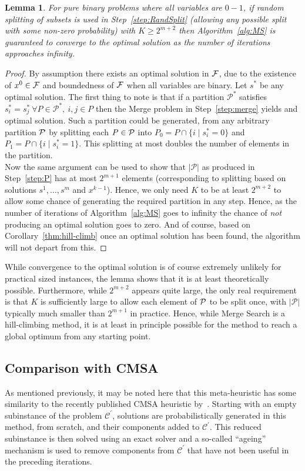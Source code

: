 \documentclass[authoryear,11pt,square,number,times,super,comma]{elsarticle}
\newtheorem{lemma}{Lemma}
\begin{document}
\begin{lemma}\label{thm:optimal}
  For pure binary problems where all variables are $0-1$, if random splitting of subsets is used in Step~\ref{step:RandSplit} (allowing any possible split with some non-zero probability) with $K\ge 2^{m+2}$ then Algorithm~\ref{alg:MS} is guaranteed to converge to the optimal solution as the number of iterations approaches infinity. 
\end{lemma}
\begin{proof}
  By assumption there exists an optimal solution in $\cal F$, due to the existence of $x^0\in\cal F$ and boundedness of $\cal F$ when all variables are binary. Let $s^*$ be any optimal solution. The first thing to note is that if a partition $\mathcal{P}^*$ satisfies $s^*_i=s^*_j\ \forall P\in \mathcal{P}^*,\ i,j\in P$ then the Merge problem in Step~\ref{step:merge} yields and optimal solution. 
  Such a partition could be generated, from any arbitrary partition $\cal P$ by splitting each $P\in\cal P$ into $P_0=P\cap \{i\mid s^*_i=0\}$ and $P_1=P\cap \{i\mid s^*_i=1\}$. This splitting at most doubles the number of elements in the partition. \\
  Now the same argument can be used to show that $|\mathcal{P}|$ as produced in Step~\ref{step:P} has at most $2^{m+1}$ elements (corresponding to splitting based on solutions $s^1,\ldots,s^m$ and $x^{k-1}$). Hence, we only need $K$ to be at least $2^{m+2}$ to allow some chance of generating the required partition in any step. Hence, as the number of iterations of Algorithm~\ref{alg:MS} goes to infinity the chance of \emph{not} producing an optimal solution goes to zero. And of course, based on Corollary~\ref{thm:hill-climb} once an optimal solution has been found, the algorithm will not depart from this.
\end{proof}
While convergence to the optimal solution is of course extremely unlikely for practical sized instances, the lemma shows that it is at least theoretically possible. Furthermore, while $2^{m+2}$ appears quite large, the only real requirement is that $K$ is sufficiently large to allow each element of $\cal P$ to be split once, with $|\mathcal{P}|$ typically much smaller than $2^{m+1}$ in practice. Hence, while Merge Search is a hill-climbing method, it is at least in principle possible for the method to reach a global optimum from any starting point.


\subsection{Comparison with CMSA}
As mentioned previously, it may be noted here that this meta-heuristic has some similarity to the
recently published CMSA heuristic by~\citet{Blum2016}. Starting with an empty subinstance of the problem $\mathcal{C}^\prime$, solutions are probabilistically generated in this method, from scratch, and their components added to $\mathcal{C}^\prime$. This reduced subinstance is then solved using an exact solver and a so-called ``ageing'' mechanism is used to remove components from $\mathcal{C}^\prime$ that have not been useful in the preceding iterations. 
\end{document}
